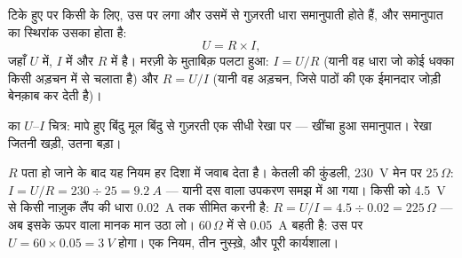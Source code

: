 \begin{proposition}[ओम का नियम]\label{prop:g8:ohms-law:law}
टिके हुए  पर किसी  के लिए, उस पर लगा  और उसमें से
गुज़रती धारा समानुपाती होते हैं, और समानुपात का स्थिरांक उसका 
होता है:
\[
U = R \times I ,
\]
जहाँ $U$  में, $I$  में और $R$  में है। मरज़ी के मुताबिक़
पलटा हुआ: $I = U/R$ (यानी वह धारा जो कोई धक्का किसी अड़चन में से
चलाता है) और $R = U/I$ (यानी वह अड़चन, जिसे पाठों की एक ईमानदार जोड़ी
बेनक़ाब कर देती है)।
\end{proposition}

\begin{omfigure}

{\small {} का $U$--$I$ चित्र: मापे हुए बिंदु मूल बिंदु से
गुज़रती एक सीधी रेखा पर --- खींचा हुआ समानुपात। रेखा जितनी खड़ी,
 उतना बड़ा।}
\end{omfigure}

\begin{example}[नियम सब कुछ हिसाब लगा देता है]\label{ex:g8:ohms-law:compute}
$R$ पता हो जाने के बाद यह नियम हर दिशा में जवाब देता है। केतली की
कुंडली, \qty{230}{V} मेन पर $25\,\Omega$: $I = U/R = 230 \div 25 =
\qty{9.2}{A}$ --- यानी दस  वाला उपकरण समझ में आ गया। किसी
 को \qty{4.5}{V} से किसी नाज़ुक लैंप की धारा \qty{0.02}{A}
तक सीमित करनी है: $R = U/I = 4.5 \div 0.02 = 225\,\Omega$ --- अब
इसके ऊपर वाला मानक मान उठा लो। $60\,\Omega$ में से \qty{0.05}{A}
बहती है: उस पर  $U = 60 \times 0.05 = \qty{3}{V}$ होगा। एक
नियम, तीन नुस्ख़े, और पूरी कार्यशाला।
\end{example}

